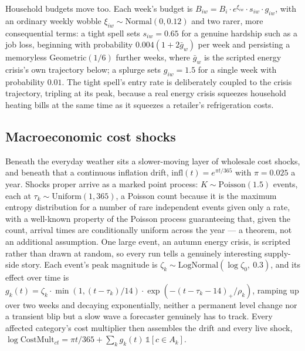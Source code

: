 \documentclass[12pt,a4paper]{article}
\begin{document}
Household budgets move too. Each week's budget is $B_{iw} = B_i \cdot
e^{\xi_{iw}} \cdot s_{iw} \cdot g_{iw}$, with an ordinary weekly wobble
$\xi_{iw} \sim \text{Normal}(0, 0.12)$ and two rarer, more consequential
terms: a tight spell sets $s_{iw}=0.65$ for a genuine hardship such as a
job loss, beginning with probability $0.004(1+2\bar{g}_w)$ per week and
persisting a memoryless $\text{Geometric}(1/6)$ further weeks, where
$\bar{g}_w$ is the scripted energy crisis's own trajectory below; a
splurge sets $g_{iw}=1.5$ for a single week with probability $0.01$. The
tight spell's entry rate is deliberately coupled to the crisis
trajectory, tripling at its peak, because a real energy crisis squeezes
household heating bills at the same time as it squeezes a retailer's
refrigeration costs.

\subsection{Macroeconomic cost shocks}

Beneath the everyday weather sits a slower-moving layer of wholesale
cost shocks, and beneath that a continuous inflation drift,
$\text{infl}(t) = e^{\pi t /365}$ with $\pi=0.025$ a year. Shocks proper
arrive as a marked point process: $K \sim \text{Poisson}(1.5)$ events,
each at $\tau_k \sim \text{Uniform}(1,365)$, a Poisson count because it
is the maximum entropy distribution for a number of rare independent
events given only a rate, with a well-known property of the Poisson
process guaranteeing that, given the count, arrival times are
conditionally uniform across the year --- a theorem, not an additional
assumption. One large event, an autumn energy crisis, is scripted rather
than drawn at random, so every run tells a genuinely interesting
supply-side story. Each event's peak magnitude is $\zeta_k \sim
\text{LogNormal}(\log\zeta_0,\ 0.3)$, and its effect over time is
$g_k(t) = \zeta_k \cdot \min(1, (t-\tau_k)/14) \cdot \exp(-(t-\tau_k-14)_+/\rho_k)$,
ramping up over two weeks and decaying exponentially, neither a
permanent level change nor a transient blip but a slow wave a forecaster
genuinely has to track. Every affected category's cost multiplier then
assembles the drift and every live shock, $\log \text{CostMult}_{ct} =
\pi t/365 + \sum_k g_k(t)\,\mathbb{1}[c \in A_k]$.
\end{document}
